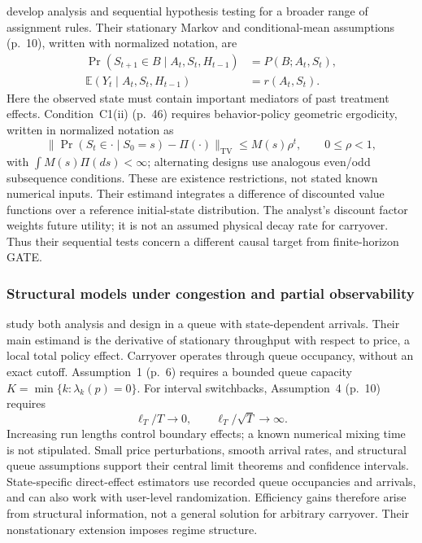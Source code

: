 \citet{shi2023} develop analysis and sequential hypothesis testing for a broader range of assignment rules. Their stationary Markov and conditional-mean assumptions (p.~10), written with normalized notation, are
\begin{align}
 \Pr(S_{t+1}\in B\mid A_t,S_t,H_{t-1})&=P(B;A_t,S_t),\\
 \mathbb{E}(Y_t\mid A_t,S_t,H_{t-1})&=r(A_t,S_t).
\end{align}
Here the observed state must contain important mediators of past treatment effects. Condition~C1(ii) (p.~46) requires behavior-policy geometric ergodicity, written in normalized notation as
\begin{equation}
 \lVert\Pr(S_t\in\cdot\mid S_0=s)-\Pi(\cdot)\rVert_{\mathrm{TV}}
 \leq M(s)\rho^t,\qquad 0\leq\rho<1,
\end{equation}
with $\int M(s)\Pi(ds)<\infty$; alternating designs use analogous even/odd subsequence conditions. These are existence restrictions, not stated known numerical inputs. Their estimand integrates a difference of discounted value functions over a reference initial-state distribution. The analyst's discount factor weights future utility; it is not an assumed physical decay rate for carryover. Thus their sequential tests concern a different causal target from finite-horizon GATE.

\subsubsection{Structural models under congestion and partial observability}

\citet{li2026} study both analysis and design in a queue with state-dependent arrivals. Their main estimand is the derivative of stationary throughput with respect to price, a local total policy effect. Carryover operates through queue occupancy, without an exact cutoff. Assumption~1 (p.~6) requires a bounded queue capacity $K=\min\{k:\lambda_k(p)=0\}$. For interval switchbacks, Assumption~4 (p.~10) requires
\begin{equation}
 \ell_T/T\longrightarrow0,
 \qquad \ell_T/\sqrt{T}\longrightarrow\infty.
\end{equation}
Increasing run lengths control boundary effects; a known numerical mixing time is not stipulated. Small price perturbations, smooth arrival rates, and structural queue assumptions support their central limit theorems and confidence intervals. State-specific direct-effect estimators use recorded queue occupancies and arrivals, and can also work with user-level randomization. Efficiency gains therefore arise from structural information, not a general solution for arbitrary carryover. Their nonstationary extension imposes regime structure.

